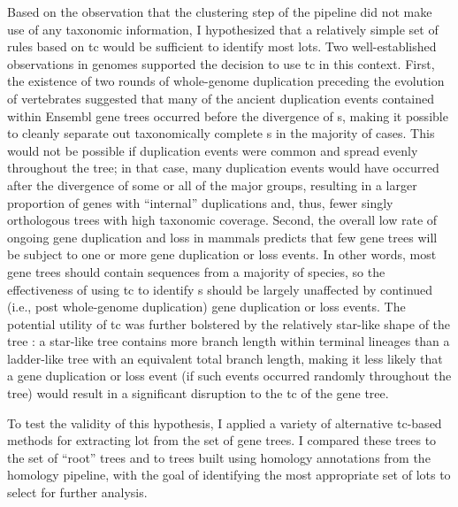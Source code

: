 Based on the observation that the clustering step of the \cmp pipeline
did not make use of any taxonomic information, I hypothesized that a
relatively simple set of rules based on \ac{tc} would be sufficient to
identify most \mammln \acp{lot}. Two well-established observations in
\mammln genomes supported the decision to use \ac{tc} in this
context. First, the existence of two rounds of whole-genome
duplication preceding the evolution of vertebrates \citep{Dehal2005}
suggested that many of the ancient duplication events contained within
Ensembl gene trees occurred before the divergence of \mamml{}s, making
it possible to cleanly separate out taxonomically complete \mammln
\subtr{}s in the majority of cases. This would not be possible if
duplication events were common and spread evenly throughout the
\mammln tree; in that case, many duplication events would have
occurred after the divergence of some or all of the major \mammln
groups, resulting in a larger proportion of \mammln genes with
``internal'' duplications and, thus, fewer singly orthologous trees
with high taxonomic coverage. Second, the overall low rate of ongoing gene
duplication and loss in mammals \citep{Demuth2006} predicts that few \mammln
gene trees will be subject to one or more gene duplication or loss
events. In other words, most \mammln gene trees should contain
sequences from a majority of \mammln species, so the effectiveness of
using \ac{tc} to identify \mammln \subtr{}s should be largely
unaffected by continued (i.e., post whole-genome duplication) gene
duplication or loss events. The potential utility of \ac{tc} was
further bolstered by the relatively star-like shape of the \mammln
tree \citep{BinindaEmonds2007}: a star-like tree contains more branch
length within terminal lineages than a ladder-like tree with an
equivalent total branch length, making it less likely that a gene
duplication or loss event (if such events occurred randomly throughout
the \mammln tree) would result in a significant disruption to the
\ac{tc} of the gene tree.

To test the validity of this hypothesis, I applied a variety of
alternative \ac{tc}-based methods for extracting \ac{lot} from the set
of \cmp gene trees. I compared these trees to the set of ``root'' \cmp
trees and to trees built using homology annotations from the \ens
homology pipeline, with the goal of identifying the most appropriate
set of \acp{lot} to select for further analysis.

